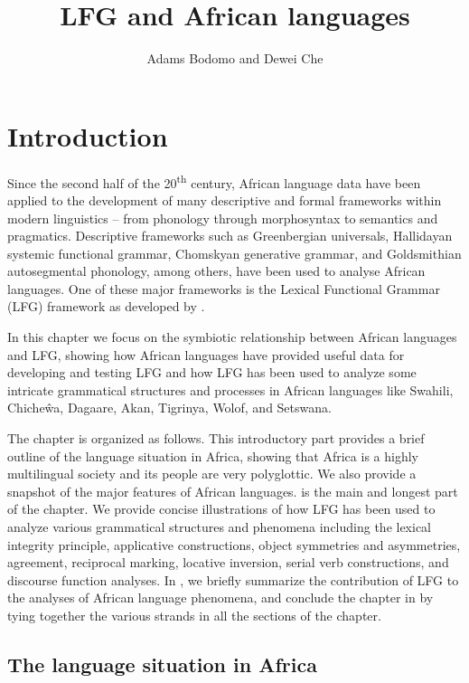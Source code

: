 \documentclass[output=paper,hidelinks]{langscibook}
\title{LFG and African languages}
\author{Adams Bodomo\affiliation{University of Vienna}  and Dewei Che\affiliation{Harbin Engineering University}}
\begin{document}
\maketitle
\label{chap:African}

\section{Introduction}
\label{sec:African:1}

Since the second half of the 20\textsuperscript{th} century, African
language data have been applied to the development of many descriptive
and formal frameworks within modern linguistics – from phonology
through morphosyntax to semantics and pragmatics. Descriptive
frameworks such as Greenbergian universals, Hallida\-yan systemic
functional grammar, Chomskyan generative grammar, and Goldsmithian
autosegmental phonology, among others, have been used to analyse
African languages. One of these major frameworks is the Lexical
Functional Grammar (LFG) framework as developed by \citet{bresnan1982introduction}.

In this chapter we focus on the symbiotic relationship between African languages and LFG, showing how African languages have provided useful data for developing and testing LFG and how LFG has been used to analyze some intricate grammatical structures and processes in African languages like Swahili, Chiche\^wa, Dagaare, Akan, Tigrinya, Wolof, and Setswana.

The chapter is organized as follows. This introductory part provides a brief outline of the language situation in Africa, showing that Africa is a highly multilingual society and its people are very polyglottic. We also provide a snapshot of the major features of African languages.  is the main and longest part of the chapter. We provide concise illustrations of how LFG has been used to analyze various grammatical structures and phenomena including the lexical integrity principle, applicative constructions, object symmetries and asymmetries, agreement, reciprocal marking, locative inversion, serial verb constructions, and discourse function analyses. In , we briefly summarize the contribution of LFG to the analyses of African language phenomena, and conclude the chapter in  by tying together the various strands in all the sections of the chapter.

\subsection{The language situation in Africa}
\label{sec:African:1.1}
\end{document}
